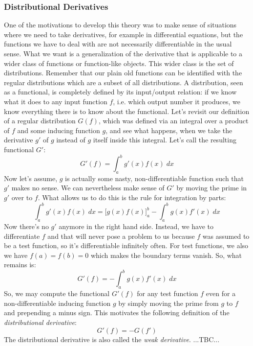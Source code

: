 \subsubsection{Distributional Derivatives}
One of the motivations to develop this theory was to make sense of situations where we need to take derivatives, for example in differential equations, but the functions we have to deal with are not necessarily differentiable in the usual sense. What we want is a generalization of the derivative that is applicable to a wider class of functions or function-like objects. This wider class is the set of distributions. Remember that our plain old functions can be identified with the regular distributions which are a subset of all distributions. A distribution, seen as a functional, is completely defined by its input/output relation: if we know what it does to any input function $f$, i.e. which output number it produces, we know everything there is to know about the functional. Let's revisit our definition of a regular distribution $G(f)$, which was defined via an integral over a product of $f$ and some inducing function $g$, and see what happens, when we take the derivative $g'$ of $g$ instead of $g$ itself inside this integral. Let's call the resulting functional $G'$:
\begin{equation}
 G'(f) = \int_a^b g'(x) f(x) \; dx
\end{equation}
Now let's assume, $g$ is actually some nasty, non-differentiable function such that $g'$ makes no sense. We can nevertheless make sense of $G'$ by moving the prime in $g'$ over to $f$. What allows us to do this is the rule for integration by parts:
\begin{equation}
 \int_a^b g'(x) f(x) \; dx = \Big[g(x) f(x)\Big]_a^b - \int_a^b g(x) f'(x) \; dx
\end{equation}
Now there's no $g'$ anymore in the right hand side. Instead, we have to differentiate $f$ and that will never pose a problem to us because $f$ was assumed to be a test function, so it's differentiable infinitely often. For test functions, we also we have $f(a) = f(b) = 0$ which makes the boundary terms vanish. So, what remains is:
\begin{equation}
 G'(f) = - \int_a^b g(x) f'(x) \; dx
\end{equation}
So, we may compute the functional $G'(f)$ for any test function $f$ even for a non-differentiable inducing function $g$ by simply moving the prime from $g$ to $f$ and prepending a minus sign. This motivates the following definition of the \emph{distributional derivative}:
\begin{equation}
  G'(f) = -G(f')
\end{equation}
The distributional derivative is also called the \emph{weak derivative}. ...TBC...

